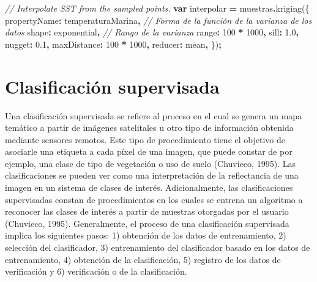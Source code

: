\documentclass[
  12pt,
  letterpaper,
  twoside]{book}
\newenvironment{Shaded}{\begin{snugshade}}{\end{snugshade}}
\newcommand{\CommentTok}[1]{\textcolor[rgb]{0.56,0.35,0.01}{\textit{#1}}}
\newcommand{\DataTypeTok}[1]{\textcolor[rgb]{0.13,0.29,0.53}{#1}}
\newcommand{\DecValTok}[1]{\textcolor[rgb]{0.00,0.00,0.81}{#1}}
\newcommand{\FloatTok}[1]{\textcolor[rgb]{0.00,0.00,0.81}{#1}}
\newcommand{\FunctionTok}[1]{\textcolor[rgb]{0.00,0.00,0.00}{#1}}
\newcommand{\KeywordTok}[1]{\textcolor[rgb]{0.13,0.29,0.53}{\textbf{#1}}}
\newcommand{\NormalTok}[1]{#1}
\newcommand{\OperatorTok}[1]{\textcolor[rgb]{0.81,0.36,0.00}{\textbf{#1}}}
\newcommand{\StringTok}[1]{\textcolor[rgb]{0.31,0.60,0.02}{#1}}
\begin{document}
\begin{Shaded}
\begin{Highlighting}[]
\CommentTok{// Interpolate SST from the sampled points.}
\KeywordTok{var}\NormalTok{ interpolar }\OperatorTok{=}\NormalTok{ muestras}\OperatorTok{.}\FunctionTok{kriging}\NormalTok{(\{}
  \DataTypeTok{propertyName}\OperatorTok{:} \StringTok{\textquotesingle{}temperaturaMarina\textquotesingle{}}\OperatorTok{,}
  \CommentTok{// Forma de la función de la varianza de los datos}
  \DataTypeTok{shape}\OperatorTok{:} \StringTok{\textquotesingle{}exponential\textquotesingle{}}\OperatorTok{,} 
  \CommentTok{// Rango de la varianza}
  \DataTypeTok{range}\OperatorTok{:} \DecValTok{100} \OperatorTok{*} \DecValTok{1000}\OperatorTok{,} 
  \DataTypeTok{sill}\OperatorTok{:} \FloatTok{1.0}\OperatorTok{,}
  \DataTypeTok{nugget}\OperatorTok{:} \FloatTok{0.1}\OperatorTok{,}
  \DataTypeTok{maxDistance}\OperatorTok{:} \DecValTok{100} \OperatorTok{*} \DecValTok{1000}\OperatorTok{,}
  \DataTypeTok{reducer}\OperatorTok{:} \StringTok{\textquotesingle{}mean\textquotesingle{}}\OperatorTok{,}
\NormalTok{\})}\OperatorTok{;}
\end{Highlighting}
\end{Shaded}

\newpage

\hypertarget{clasificaciuxf3n-supervisada}{%
\chapter{Clasificación supervisada}\label{clasificaciuxf3n-supervisada}}

Una clasificación supervisada se refiere al proceso en el cual se genera un mapa temático a partir de imágenes satelitales u otro tipo de información obtenida mediante sensores remotos. Este tipo de procedimiento tiene el objetivo de asociarle una etiqueta a cada píxel de una imagen, que puede constar de por ejemplo, una clase de tipo de vegetación o uso de suelo (Chuvieco, 1995). Las clasificaciones se pueden ver como una interpretación de la reflectancia de una imagen en un sistema de clases de interés. Adicionalmente, las clasificaciones supervisadas constan de procedimientos en los cuales se entrena un algoritmo a reconocer las clases de interés a partir de muestras otorgadas por el usuario (Chuvieco, 1995). Generalmente, el proceso de una clasificación supervisada implica los siguientes pasos: 1) obtención de los datos de entrenamiento, 2) selección del clasificador, 3) entrenamiento del clasificador basado en los datos de entrenamiento, 4) obtención de la clasificación, 5) registro de los datos de verificación y 6) verificación o de la clasificación.
\end{document}
